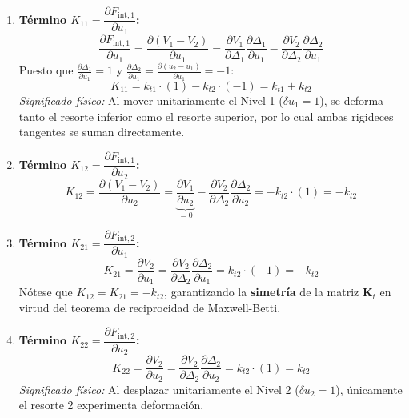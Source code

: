\documentclass[11pt,letterpaper]{article}
\begin{document}
\begin{enumerate}
    \item \textbf{Término $K_{11} = \dfrac{\partial F_{\text{int},1}}{\partial u_1}$:}
    \begin{equation}
        \frac{\partial F_{\text{int},1}}{\partial u_1} = \frac{\partial \left(V_1 - V_2\right)}{\partial u_1} = \frac{\partial V_1}{\partial \Delta_1} \frac{\partial \Delta_1}{\partial u_1} - \frac{\partial V_2}{\partial \Delta_2} \frac{\partial \Delta_2}{\partial u_1}
    \end{equation}
    Puesto que $\frac{\partial \Delta_1}{\partial u_1} = 1$ y $\frac{\partial \Delta_2}{\partial u_1} = \frac{\partial (u_2 - u_1)}{\partial u_1} = -1$:
    \begin{equation}
        K_{11} = k_{t1} \cdot (1) - k_{t2} \cdot (-1) = k_{t1} + k_{t2}
    \end{equation}
    \textit{Significado físico:} Al mover unitariamente el Nivel 1 ($\delta u_1 = 1$), se deforma tanto el resorte inferior como el resorte superior, por lo cual ambas rigideces tangentes se suman directamente.

    \item \textbf{Término $K_{12} = \dfrac{\partial F_{\text{int},1}}{\partial u_2}$:}
    \begin{equation}
        K_{12} = \frac{\partial \left(V_1 - V_2\right)}{\partial u_2} = \underbrace{\frac{\partial V_1}{\partial u_2}}_{=0} - \frac{\partial V_2}{\partial \Delta_2} \frac{\partial \Delta_2}{\partial u_2} = -k_{t2} \cdot (1) = -k_{t2}
    \end{equation}

    \item \textbf{Término $K_{21} = \dfrac{\partial F_{\text{int},2}}{\partial u_1}$:}
    \begin{equation}
        K_{21} = \frac{\partial V_2}{\partial u_1} = \frac{\partial V_2}{\partial \Delta_2} \frac{\partial \Delta_2}{\partial u_1} = k_{t2} \cdot (-1) = -k_{t2}
    \end{equation}
    Nótese que $K_{12} = K_{21} = -k_{t2}$, garantizando la \textbf{simetría} de la matriz $\mathbf{K}_t$ en virtud del teorema de reciprocidad de Maxwell-Betti.

    \item \textbf{Término $K_{22} = \dfrac{\partial F_{\text{int},2}}{\partial u_2}$:}
    \begin{equation}
        K_{22} = \frac{\partial V_2}{\partial u_2} = \frac{\partial V_2}{\partial \Delta_2} \frac{\partial \Delta_2}{\partial u_2} = k_{t2} \cdot (1) = k_{t2}
    \end{equation}
    \textit{Significado físico:} Al desplazar unitariamente el Nivel 2 ($\delta u_2 = 1$), únicamente el resorte 2 experimenta deformación.
\end{enumerate}
\end{document}

